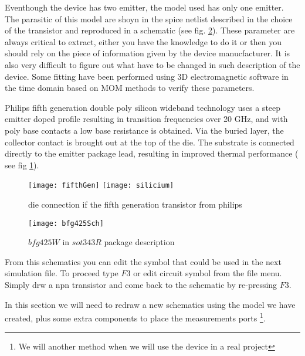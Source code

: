 Eventhough the device has two emitter, the model used has only one emitter. The parasitic of this model are shoyn in the spice netlist described in the choice of the transistor and reproduced in a schematic (see fig. \ref{design:pa:model:parasitSch}). These parameter are always critical to extract, either you have the knowledge to do it or then you should rely on the piece of information given by the device manucfacturer. It is also very difficult to figure out what have to be changed in such description of the device. Some fitting have been performed using 3D electromagnetic software in the time domain based on MOM methods to verify these parameters.

Philips  fifth  generation double poly silicon wideband technology uses a steep emitter doped profile resulting in transition frequencies over 20 GHz, and with poly base contacts a low base resistance is obtained. Via the buried layer, the collector contact is brought out at the top of the die. The substrate is connected directly to the emitter package lead, resulting in improved thermal performance ( see fig \ref{design:pa:model:fifthGen}).

\begin{figure}[htbp]
\begin{center}
	\texttt{[image: fifthGen]}
	\texttt{[image: silicium]}
	\caption{die connection if the fifth generation transistor from philips}
	\label{design:pa:model:fifthGen}
\end{center}
\end{figure}


\begin{figure}[htbp]
\begin{center}
	\texttt{[image: bfg425Sch]}
	\caption{$bfg425W$ in $sot343R$ package description}
	\label{design:pa:model:parasitSch}
\end{center}
\end{figure}

From this schematics you can edit the symbol that could be used in the next simulation file. To proceed type $F3$ or edit circuit symbol from the file menu. Simply drw a npn transistor and come back to the schematic by re-pressing $F3$.


In this section we will need to redraw a new schematics using the model we have created, plus some extra components to place the measurements ports \footnote{We will another method when we will use the device in a real project}.


